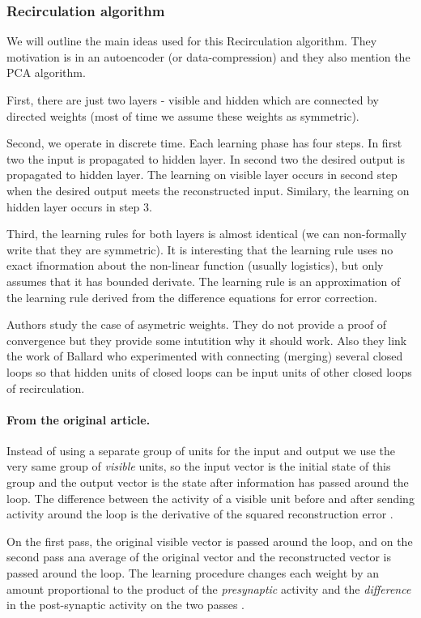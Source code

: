 \subsubsection{Recirculation algorithm}

We will outline the main ideas used for this Recirculation algorithm. They motivation is in an autoencoder (or data-compression) and they also mention the PCA algorithm. 

First, there are just two layers - visible and hidden which are connected by directed weights (most of time we assume these weights as symmetric). 

Second, we operate in discrete time. Each learning phase has four steps. In first two the input is propagated to hidden layer. In second two the desired output is propagated to hidden layer. The learning on visible layer occurs in second step when the desired output meets the reconstructed input. Similary, the learning on hidden layer occurs in step 3.

Third, the learning rules for both layers is almost identical (we can non-formally write that they are symmetric). It is interesting that the learning rule uses no exact ifnormation about the non-linear function (usually logistics), but only assumes that it has bounded derivate. The learning rule is an approximation of the learning rule derived from the difference equations for error correction. 

Authors study the case of asymetric weights. They do not provide a proof of convergence but they provide some intutition why it should work. Also they link the work of Ballard who experimented with connecting (merging) several closed loops so that hidden units of closed loops can be input units of other closed loops of recirculation.

\paragraph{From the original article.}
Instead of using a separate group of units for the input and output we use the very same group of \textit{visible} units, so the input vector is the initial state of this group and the output vector is the state after information has passed around the loop. The difference between the activity of a visible unit before and after sending activity around the loop is the derivative of the squared reconstruction error \cite{hinton1988learning}.

On the first pass, the original visible vector is passed around the loop, and on the second pass ana average of the original vector and the reconstructed vector is passed around the loop. The learning procedure changes each weight by an amount proportional to the product of the \textit{presynaptic} activity and the \textit{difference} in the post-synaptic activity on the two passes  \cite{hinton1988learning}.

